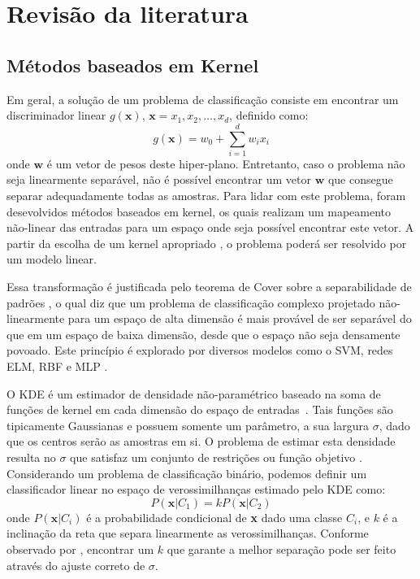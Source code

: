 \documentclass[conference]{IEEEtran}
\begin{document}
	\section{Revisão da literatura}

	\subsection{Métodos baseados em Kernel}
	Em geral, a solução de um problema de classificação consiste em encontrar um discriminador linear $g(\textbf{x})$, $\textbf{x} = x_1,x_2,\dots, x_d$, definido como:
	\begin{equation}
		g(\textbf{x}) = w_0 + \sum_{i=1}^{d}w_ix_i
	\end{equation}
	onde $\textbf{w}$ é um vetor de pesos deste hiper-plano. Entretanto, caso o problema não seja linearmente separável, não é possível encontrar um vetor $\textbf{w}$ que consegue separar adequadamente todas as amostras. Para lidar com este problema, foram desevolvidos métodos baseados em kernel, os quais realizam um mapeamento não-linear das entradas para um espaço onde seja possível encontrar este vetor. A partir da escolha de um kernel apropriado \cite{mercer1909xvi,courant89}, o problema poderá ser resolvido por um modelo linear.
	
	Essa transformação é justificada pelo teorema de Cover sobre a separabilidade de padrões \cite{cover1965geometrical}, o qual diz que um	problema de classificação complexo projetado não-linearmente para um espaço de alta dimensão é mais provável de ser	separável do que em um espaço de baixa dimensão, desde que o espaço não seja densamente povoado. Este princípio é explorado por diversos modelos como o SVM, redes ELM, RBF e MLP \cite{haykin2007neural}. 
	
	O KDE é um estimador de densidade não-paramétrico baseado na soma de funções de kernel em cada dimensão do espaço de entradas~\cite{wang2013gaussian}. Tais funções são tipicamente Gaussianas e possuem somente um parâmetro, a sua largura $\sigma$, dado que os centros serão as amostras em si. O problema de estimar esta densidade resulta no $\sigma$ que satisfaz um conjunto de restrições ou função objetivo \cite{menezes2019width}. Considerando um problema de classificação binário, podemos definir um classificador linear no espaço de verossimilhanças estimado pelo KDE como:
	\begin{equation}
		P(\textbf{x}|C_1) = kP(\textbf{x}|C_2)
	\end{equation}
	onde $P(\textbf{x}|C_i)$ é a probabilidade condicional de \textbf{x} dado uma classe $C_i$, e $k$ é a inclinação da reta que separa linearmente as verossimilhanças. Conforme observado por \cite{menezes2019width}, encontrar um $k$ que garante a melhor separação pode ser feito através do ajuste correto de $\sigma$.
	
\end{document}
